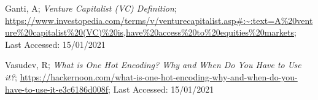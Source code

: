 \documentclass[12pt, conference]{IEEEtran}
\begin{document}
\begin{thebibliography}{}


Ganti, A; \textit{Venture Capitalist (VC) Definition}; \url{https://www.investopedia.com/terms/v/venturecapitalist.asp#:~:text=A\%20venture\%20capitalist\%20(VC)\%20is,have\%20access\%20to\%20equities\%20markets}; Last Accessed: 15/01/2021


Vasudev, R; \textit{What is One Hot Encoding? Why and When Do You Have to Use it?}; \url{https://hackernoon.com/what-is-one-hot-encoding-why-and-when-do-you-have-to-use-it-e3c6186d008f}; Last Accessed: 15/01/2021

\end{thebibliography}




\end{document}
